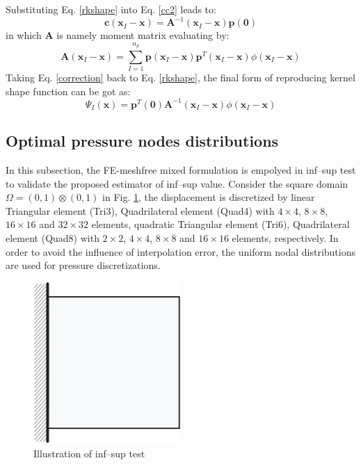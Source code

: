 Substituting Eq. \ref{rkshape} into Eq. \eqref{cc2} leads to:
\begin{equation}\label{correction}
\boldsymbol c(\boldsymbol x_I-\boldsymbol x) = \boldsymbol A^{-1}(\boldsymbol x_I-\boldsymbol x)\boldsymbol p(\boldsymbol 0)
\end{equation}
in which $\boldsymbol A$ is namely moment matrix evaluating by:
\begin{equation}
\boldsymbol A(\boldsymbol x_I-\boldsymbol x) = \sum_{I=1}^{n_p}\boldsymbol p(\boldsymbol x_I-\boldsymbol x) \boldsymbol p^T(\boldsymbol x_I-\boldsymbol x)\phi(\boldsymbol x_I-\boldsymbol x)
\end{equation}
Taking Eq. \eqref{correction} back to Eq. \eqref{rkshape}, the final form of reproducing kernel shape function can be got as:
\begin{equation}
\Psi_I(\boldsymbol x) = \boldsymbol p^T(\boldsymbol 0) \boldsymbol A^{-1}(\boldsymbol x_I-\boldsymbol x)\phi(\boldsymbol x_I-\boldsymbol x)
\end{equation}


\subsection{Optimal pressure nodes distributions}

In this subsection, the FE-meshfree mixed formulation is empolyed in inf--sup test \cite{chapelle1993} to validate the proposed estimator of inf--sup value.
Consider the square domain $\Omega = (0,1)\otimes (0,1)$ in Fig. \ref{fg:inf_sup_test},
the displacement is discretized by linear Triangular element (Tri3), Quadrilateral element (Quad4) with
$4\times 4$, $8\times 8$, $16\times 16$ and $32\times 32$ elements,
quadratic Triangular element (Tri6), Quadrilateral element (Quad8) with 
$2\times 2$, $4\times 4$, $8\times 8$ and $16\times 16$ elements, respectively.
In order to avoid the influence of interpolation error,
the uniform nodal distributions are used for pressure discretizations.

\begin{figure}[H]
\centering
\includegraphics[width=0.5\textwidth]{png/infsup_model.png}
\caption{Illustration of inf--sup test}\label{fg:inf_sup_test}
\end{figure}

